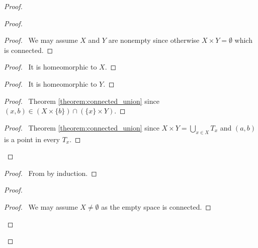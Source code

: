 \begin{proof}
    \pf
    \begin{proof}
        \begin{proof}
            \pf\ We may assume $X$ and $Y$ are nonempty since otherwise $X \times Y = \emptyset$ which is connected.
        \end{proof}
        \begin{proof}
            \pf\ It is homeomorphic to $X$.
        \end{proof}
        \begin{proof}
            \pf\ It is homeomorphic to $Y$.
        \end{proof}
        \begin{proof}
            \pf\ Theorem \ref{theorem:connected_union} since $(x,b) \in (X \times \{b\}) \cap (\{x\} \times Y)$.
        \end{proof}
        \begin{proof}
            \pf\ Theorem \ref{theorem:connected_union} since $X \times Y = \bigcup_{x \in X} T_x$ and $(a,b)$ is a point in every $T_x$.
        \end{proof}
    \end{proof}
    \begin{proof}
        \pf\ From  by induction.
    \end{proof}
    \begin{proof}
        \begin{proof}
            \pf\ We may assume $X \neq \emptyset$ as the empty space is connected.
        \end{proof}

\end{proof}
\end{proof}
